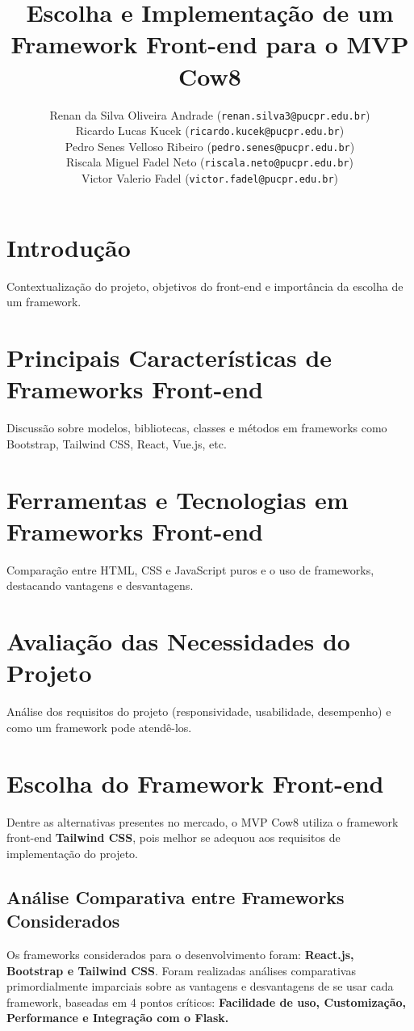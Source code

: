\documentclass[11pt]{article}
\title{\textbf{Escolha e Implementação de um Framework Front-end para o MVP Cow8}}
\author{
    Renan da Silva Oliveira Andrade (\texttt{renan.silva3@pucpr.edu.br})\\
    Ricardo Lucas Kucek (\texttt{ricardo.kucek@pucpr.edu.br})\\
    Pedro Senes Velloso Ribeiro (\texttt{pedro.senes@pucpr.edu.br})\\
    Riscala Miguel Fadel Neto (\texttt{riscala.neto@pucpr.edu.br})\\
    Victor Valerio Fadel (\texttt{victor.fadel@pucpr.edu.br})
}
\begin{document}
\maketitle

\section{Introdução}

Contextualização do projeto, objetivos do front-end e importância da escolha de um framework.

\section{Principais Características de Frameworks Front-end}

Discussão sobre modelos, bibliotecas, classes e métodos em frameworks como Bootstrap, Tailwind CSS, React, Vue.js, etc.

\section{Ferramentas e Tecnologias em Frameworks Front-end}

Comparação entre HTML, CSS e JavaScript puros e o uso de frameworks, destacando vantagens e desvantagens.

\section{Avaliação das Necessidades do Projeto}

Análise dos requisitos do projeto (responsividade, usabilidade, desempenho) e como um framework pode atendê-los.

\section{Escolha do Framework Front-end}

Dentre as alternativas presentes no mercado, o MVP Cow8 utiliza o framework front-end \textbf{Tailwind CSS}, pois melhor se adequou aos requisitos de implementação do projeto.

\subsection{Análise Comparativa entre Frameworks Considerados}

Os frameworks considerados para o desenvolvimento foram: \textbf{React.js, Bootstrap e Tailwind CSS}. Foram realizadas análises comparativas primordialmente imparciais sobre as vantagens e desvantagens de se usar cada framework, baseadas em 4 pontos críticos: \textbf{Facilidade de uso, Customização, Performance e Integração com o Flask.}
\end{document}
